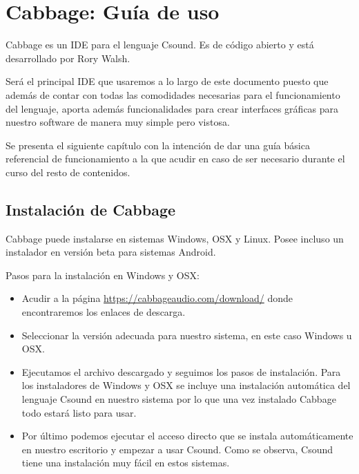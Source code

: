 
\chapter{Cabbage: Guía de uso}

Cabbage es un IDE para el lenguaje Csound. Es de código abierto y está desarrollado por Rory Walsh.

Será el principal IDE que usaremos a lo largo de este documento puesto que además de contar con todas las comodidades necesarias para el funcionamiento del lenguaje, aporta además funcionalidades para crear interfaces gráficas para nuestro software de manera muy simple pero vistosa.

Se presenta el siguiente capítulo con la intención de dar una guía básica referencial de funcionamiento a la que acudir en caso de ser necesario durante el curso del resto de contenidos.

\section{Instalación de Cabbage}\label{sec:CabbageInst}

Cabbage puede instalarse en sistemas Windows, OSX y Linux. Posee incluso un instalador en versión beta para sistemas Android.

Pasos para la instalación en Windows y OSX:

\begin{itemize}
 \item Acudir a la página \url{https://cabbageaudio.com/download/} donde encontraremos los enlaces de descarga.
 \item Seleccionar la versión adecuada para nuestro sistema, en este caso Windows u OSX.
 
  
 \item Ejecutamos el archivo descargado y seguimos los pasos de instalación. Para los instaladores de Windows y OSX se incluye una instalación automática del lenguaje Csound en nuestro sistema por lo que una vez instalado Cabbage todo estará listo para usar.
 \item Por último podemos ejecutar el acceso directo que se instala automáticamente en nuestro escritorio y empezar a usar Csound. Como se observa, Csound tiene una instalación muy fácil en estos sistemas.
\end{itemize}

